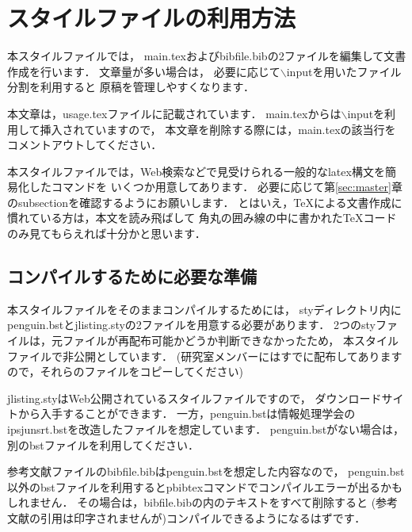 %
%

\section{スタイルファイルの利用方法}
\label{sec:usage}

本スタイルファイルでは，
main.texおよびbibfile.bibの2ファイルを編集して文書作成を行います．
文章量が多い場合は，
必要に応じて$\backslash$inputを用いたファイル分割を利用すると
原稿を管理しやすくなります．

本文章は，usage.texファイルに記載されています．
main.texからは$\backslash$inputを利用して挿入されていますので，
本文章を削除する際には，main.texの該当行をコメントアウトしてください．

本スタイルファイルでは，Web検索などで見受けられる一般的なlatex構文を簡易化したコマンドを
いくつか用意してあります．
必要に応じて第\ref{sec:master}章のsubsectionを確認するようにお願いします．
とはいえ，TeXによる文書作成に慣れている方は，本文を読み飛ばして
角丸の囲み線の中に書かれたTeXコードのみ見てもらえれば十分かと思います．

\subsection{コンパイルするために必要な準備}
本スタイルファイルをそのままコンパイルするためには，
styディレクトリ内にpenguin.bstとjlisting.styの2ファイルを用意する必要があります．
2つのstyファイルは，元ファイルが再配布可能かどうか判断できなかったため，
本スタイルファイルで非公開としています．
(研究室メンバーにはすでに配布してありますので，それらのファイルをコピーしてください)

jlisting.styはWeb公開されているスタイルファイルですので，
ダウンロードサイトから入手することができます．
一方，penguin.bstは情報処理学会のipsjunsrt.bstを改造したファイルを想定しています．
penguin.bstがない場合は，別のbstファイルを利用してください．

参考文献ファイルのbibfile.bibはpenguin.bstを想定した内容なので，
penguin.bst以外のbstファイルを利用するとpbibtexコマンドでコンパイルエラーが出るかもしれません．
その場合は，bibfile.bibの内のテキストをすべて削除すると
(参考文献の引用は印字されませんが)コンパイルできるようになるはずです．
